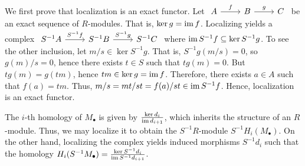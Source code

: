 \documentclass[../../master.tex]{subfiles}
\begin{document}
\begin{solution}
    We first prove that localization is an exact functor.
    Let
    $
    \begin{tikzcd}
        A & B & C
        \arrow["f", from=1-1, to=1-2]
        \arrow["g", from=1-2, to=1-3] 
    \end{tikzcd}
    $
    be an exact sequence of $R$-modules.
    That is, $\ker g = \operatorname{im} f$.
    Localizing yields a complex
    $
    \begin{tikzcd}
        S^{-1}A & S^{-1}B & S^{-1}C
        \arrow["S^{-1}f", from=1-1, to=1-2]
        \arrow["S^{-1}g", from=1-2, to=1-3] 
    \end{tikzcd}
    $
    where $\operatorname{im} S^{-1}f \subseteq \ker S^{-1}g$.
    To see the other inclusion, let $m / s \in \ker S^{-1}g$.
    That is, $S^{-1}g(m / s) = 0$, so $g(m) / s = 0$, hence there exists $t \in S$ such that $t g(m) = 0$.
    But $t g(m) = g(tm)$, hence $tm \in \ker g = \operatorname{im} f$.
    Therefore, there exists $a \in A$ such that $f(a) = tm$.
    Thus, $m / s = mt / st = f(a) / st \in \operatorname{im} S^{-1}f$.
    Hence, localization is an exact functor.

    The $i$-th homology of $M_{\bullet}$ is given by $\frac{\ker d_i}{\operatorname{im} d_{i+1}}$, which inherits the structure of an $R$-module.
    Thus, we may localize it to obtain the $S^{-1}R$-module $S^{-1}H_i(M_{\bullet})$.
    On the other hand, localizing the complex yields induced morphisms $S^{-1}d_i$ such that the homology $H_i(S^{-1}M_{\bullet}) = \frac{\ker S^{-1}d_i}{\operatorname{im} S^{-1}d_{i+1}}$.


\end{solution}
\end{document}
